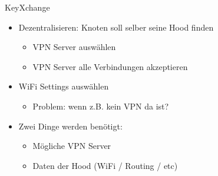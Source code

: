 \begin{frame}{KeyXchange}
    \begin{itemize}
        \item Dezentralisieren: Knoten soll selber seine Hood finden
        \begin{itemize}
            \item VPN Server auswählen
            \item VPN Server alle Verbindungen akzeptieren
        \end{itemize}
        \item WiFi Settings auswählen
        \begin{itemize}
            \item Problem: wenn z.B. kein VPN da ist?
        \end{itemize}
        \item Zwei Dinge werden benötigt: 
        \begin{itemize}
            \item Mögliche VPN Server
            \item Daten der Hood (WiFi / Routing / etc)
        \end{itemize}
    \end{itemize}
\end{frame}

